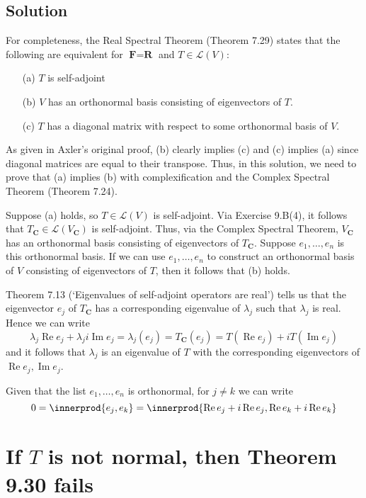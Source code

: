 \documentclass{article}
\DeclarePairedDelimiter{\innerprod}\langle\rangle
\begin{document}
\subsection*{Solution}
For completeness, the Real Spectral Theorem (Theorem 7.29) states that the following are equivalent for $\textbf{F}=\textbf{R}$ and $T\in\mathcal{L}(V)$:
\begin{enumerate}
  \item[(a)] $T$ is self-adjoint
  \item[(b)] $V$ has an orthonormal basis consisting of eigenvectors of $T$.
  \item[(c)] $T$ has a diagonal matrix with respect to some orthonormal basis of $V$.
\end{enumerate}
As given in Axler's original proof, (b) clearly implies (c) and (c) implies (a) since diagonal matrices are equal to their transpose. 
Thus, in this solution, we need to prove that (a) implies (b) with complexification and the Complex Spectral Theorem (Theorem 7.24).

Suppose (a) holds, so $T\in\mathcal{L}(V)$ is self-adjoint. 
Via Exercise 9.B(4), it follows that $T_{\textbf{C}}\in\mathcal{L}(V_{\textbf{C}})$ is self-adjoint. 
Thus, via the Complex Spectral Theorem, $V_{\textbf{C}}$ has an orthonormal basis consisting of eigenvectors of $T_{\textbf{C}}$. Suppose $e_1,\ldots,e_n$ is this orthonormal basis. 
If we can use $e_1,\ldots,e_n$ to construct an orthonormal basis of $V$ consisting of eigenvectors of $T$, then it follows that (b) holds.

Theorem 7.13 (`Eigenvalues of self-adjoint operators are real') tells us that the eigenvector $e_j$ of $T_{\textbf{C}}$ has a corresponding eigenvalue of $\lambda_j$ such that $\lambda_j$ is real. 
Hence we can write
\[\lambda_j\operatorname{Re}e_j+\lambda_ji\operatorname{Im}e_j = \lambda_j(e_j) = T_{\textbf{C}}(e_j)=T(\operatorname{Re}e_j) + iT(\operatorname{Im}e_j)\]
and it follows that $\lambda_j$ is an eigenvalue of $T$ with the corresponding eigenvectors of $\operatorname{Re}e_j,\operatorname{Im}e_j$.

Given that the list $e_1,\ldots,e_n$ is orthonormal, for $j\neq k$ we can write
\[0=\innerprod{e_j,e_k}=\innerprod{\operatorname{Re}e_j+i\operatorname{Re}e_j,\operatorname{Re}e_k+i\operatorname{Re}e_k}\]

\clearpage

\section{If $T$ is not normal, then Theorem 9.30 fails}
\end{document}
